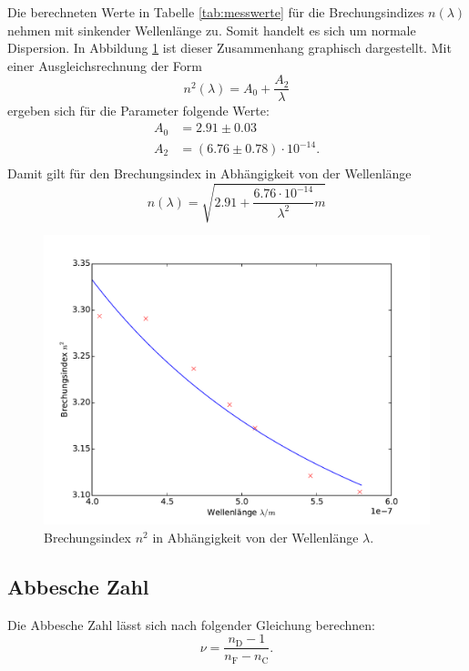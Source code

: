 Die berechneten Werte in Tabelle \ref{tab:messwerte} für die Brechungsindizes $n(\lambda)$ nehmen mit sinkender Wellenlänge zu. Somit handelt es sich um normale Dispersion.
In Abbildung \ref{fig:dispersion} ist dieser Zusammenhang graphisch dargestellt. Mit einer Ausgleichsrechnung der Form
\begin{equation}
  \label{eqn:disp}
  n^2(\lambda)= A_0 + \frac{A_2}{\lambda}
\end{equation}
ergeben sich für die Parameter folgende Werte:
\begin{align}
  A_0 &= 2.91 \pm 0.03 \nonumber \\
  A_2 &= (6.76 \pm 0.78)\cdot 10^{-14}. \nonumber \\
\end{align}
Damit gilt für den Brechungsindex in Abhängigkeit von der Wellenlänge
\begin{equation}
  \label{eqn:n}
  n(\lambda) =\sqrt{2.91 + \frac{6.76\cdot10^{-14}}{\lambda^2}m}
\end{equation}

\begin{figure}
  \centering
  \includegraphics[scale=0.8]{auswertung/plot.pdf}
\caption{Brechungsindex $n^2$ in Abhängigkeit von der Wellenlänge $\lambda$.}
  \label{fig:dispersion}
\end{figure}

\subsection{Abbesche Zahl}
Die Abbesche Zahl lässt sich nach folgender Gleichung berechnen:
\begin{equation}
  \label{eqn:abbe1}
  \nu =\frac{n_\mathrm{D}-1}{n_\mathrm{F}-n_\mathrm{C}}.
\end{equation}


